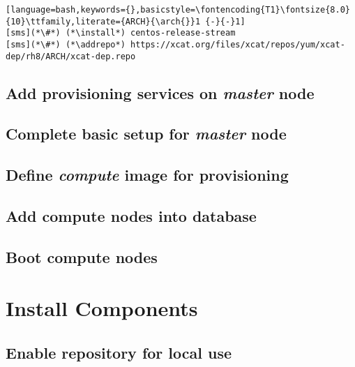 \documentclass[letterpaper]{article}
\newcommand{\arch}{x86\_64}
\newcommand{\addrepo}{wget -P /etc/yum.repos.d}
\newcommand{\install}{yum -y install}
\begin{document}
\begin{lstlisting}[language=bash,keywords={},basicstyle=\fontencoding{T1}\fontsize{8.0}{10}\ttfamily,literate={ARCH}{\arch{}}1 {-}{-}1]
[sms](*\#*) (*\install*) centos-release-stream
[sms](*\#*) (*\addrepo*) https://xcat.org/files/xcat/repos/yum/xcat-dep/rh8/ARCH/xcat-dep.repo
\end{lstlisting}

\subsection{Add provisioning services on {\em master} node} \label{sec:add_provisioning}

%

\vspace*{-0.15cm}
\subsection{Complete basic \xCAT{} setup for {\em master} node} \label{sec:setup_xcat}



\subsection{Define {\em compute} image for provisioning}


\subsection{Add compute nodes into \xCAT{} database} \label{sec:xcat_add_nodes}


\subsection{Boot compute nodes} \label{sec:boot_computes}
 




\section{Install \OHPC{} Components} \label{sec:basic_install}



\subsection{Enable \OHPC{} repository for local use} \label{sec:enable_repo}

\end{document}
